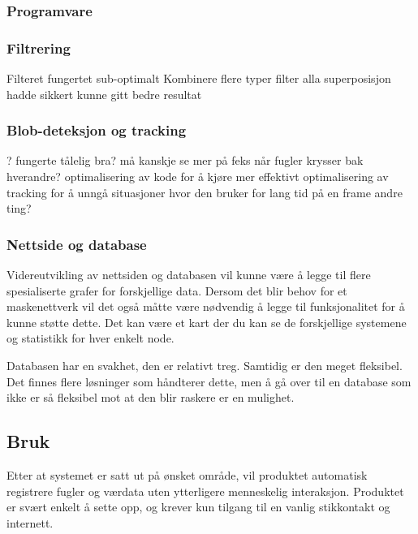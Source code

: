 \subsubsection{Programvare}
\subsubsection{Filtrering}
Filteret fungertet sub-optimalt
Kombinere flere typer filter alla superposisjon hadde sikkert kunne gitt bedre resultat

\subsubsection{Blob-deteksjon og tracking}
? 
fungerte tålelig bra? 
må kanskje se mer på feks når fugler krysser bak hverandre?
optimalisering av kode for å kjøre mer effektivt
optimalisering av tracking for å unngå situasjoner hvor den bruker for lang tid på en frame
andre ting? %


\subsubsection{Nettside og database}

Videreutvikling av nettsiden og databasen vil kunne være å legge til flere spesialiserte grafer for forskjellige data. 
Dersom det blir behov for et maskenettverk vil det også måtte være nødvendig å legge til funksjonalitet for å kunne støtte dette. 
Det kan være et kart der du kan se de forskjellige systemene og statistikk for hver enkelt node. 

Databasen har en svakhet, den er relativt treg. Samtidig er den meget fleksibel. 
Det finnes flere løsninger som håndterer dette, men å gå over til en database som ikke er så fleksibel mot at den blir raskere er en mulighet. 


\subsection{Bruk}

Etter at systemet er satt ut på ønsket område, vil produktet automatisk registrere fugler og værdata uten ytterligere menneskelig interaksjon. 
Produktet er svært enkelt å sette opp, og krever kun tilgang til en vanlig stikkontakt og internett. 

